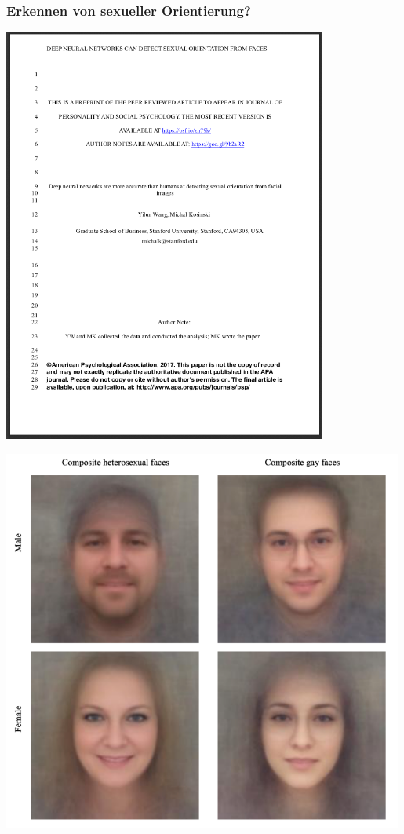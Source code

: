 \documentclass[aspectratio=43,x11names]{beamer}
\begin{document}
\begin{frame}
\frametitle{Erkennen von sexueller Orientierung?}
\begin{minipage}{.6\textwidth}
\includegraphics[width=0.8\textwidth, keepaspectratio]{images/paper_orientation}
\end{minipage}\hspace*{-25pt}\begin{minipage}{.4\textwidth}
\includegraphics[width=0.99\textwidth, keepaspectratio]{images/composite_faces}
\end{minipage}


\end{frame}
\end{document}
